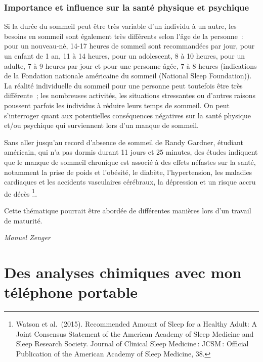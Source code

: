 \documentclass[
  10pt,
  french,
  a5paper,
  openany]{book}
\newenvironment{signature}{\begin{flushright}}{\end{flushright}}
\begin{document}
\hypertarget{importance-et-influence-sur-la-santuxe9-physique-et-psychique}{%
\subsection*{Importance et influence sur la santé physique et psychique}\label{importance-et-influence-sur-la-santuxe9-physique-et-psychique}}

Si la durée du sommeil peut être très variable d'un individu à un autre, les besoins en sommeil sont également très différents selon l'âge de la personne~: pour un nouveau-né, 14-17 heures de sommeil sont recommandées par jour, pour un enfant de 1 an, 11 à 14 heures, pour un adolescent, 8 à 10 heures, pour un adulte, 7 à 9 heures par jour et pour une personne âgée, 7 à 8 heures (indications de la Fondation nationale américaine du sommeil (National Sleep Foundation)). La réalité individuelle du sommeil pour une personne peut toutefois être très différente~; les nombreuses activités, les situations stressantes ou d'autres raisons poussent parfois les individus à réduire leurs temps de sommeil. On peut s'interroger quant aux potentielles conséquences négatives sur la santé physique et/ou psychique qui surviennent lors d'un manque de sommeil.

Sans aller jusqu'au record d'absence de sommeil de Randy Gardner, étudiant américain, qui n'a pas dormis durant 11 jours et 25 minutes, des études indiquent que le manque de sommeil chronique est associé à des effets néfastes sur la santé, notamment la prise de poids et l'obésité, le diabète, l'hypertension, les maladies cardiaques et les accidents vasculaires cérébraux, la dépression et un risque accru de décès \footnote{Watson et al.~(2015). Recommended Amount of Sleep for a Healthy Adult: A Joint Consensus Statement of the American Academy of Sleep Medicine and Sleep Research Society. Journal of Clinical Sleep Medicine\,: JCSM\,: Official Publication of the American Academy of Sleep Medicine, 38.}.

Cette thématique pourrait être abordée de différentes manières lors d'un travail de maturité.

\begin{signature}
\emph{Manuel Zenger}

\end{signature}

\hypertarget{des-analyses-chimiques-avec-mon-tuxe9luxe9phone-portable}{%
\chapter{\texorpdfstring{Des analyses chimiques \linebreak avec mon téléphone portable}{Des analyses chimiques avec mon téléphone portable}}\label{des-analyses-chimiques-avec-mon-tuxe9luxe9phone-portable}}
\end{document}
